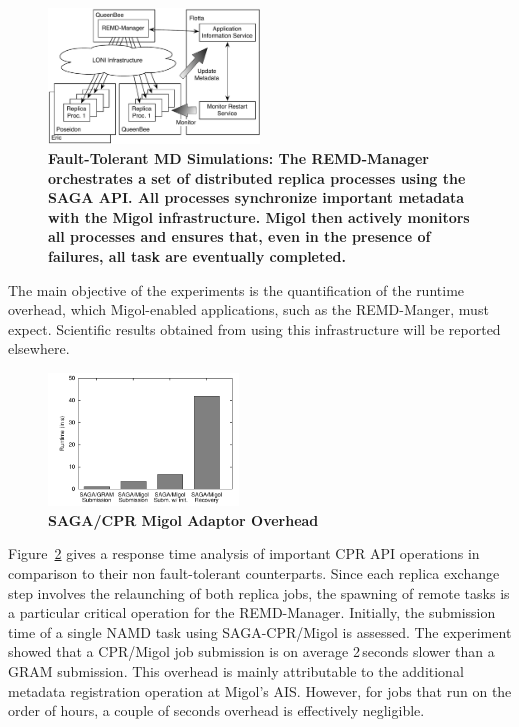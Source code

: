 \documentclass[conference,final]{IEEEtran}
\newcommand{\jhanote}[1]{ {\textcolor{red} { ***SJ: #1 }}}
\newcommand{\jhanote}[1]{}
\newcommand{\up}{\vspace*{-1em}}
\begin{document}
\begin{figure}[t]
    \centering
        \includegraphics[width=0.5\textwidth]{saga-taskfarming}
        \caption{\small \bf Fault-Tolerant MD Simulations: The
          REMD-Manager orchestrates a set of distributed replica
          processes using the SAGA API. All processes synchronize
          important metadata with the Migol infrastructure. Migol then
          actively monitors all processes and ensures that, even in
          the presence of failures, all task are eventually
          completed.\up\up}
    \label{fig:saga-taskfarming}
\end{figure} 
The main objective of the experiments is the quantification of the runtime overhead, 
which Migol-enabled applications, such as the REMD-Manger, must expect.
Scientific results obtained from using this infrastructure will be 
reported elsewhere.

\begin{figure}[ht]
    \centering
        \includegraphics[width=0.45\textwidth]{performance/perf_submission.pdf}
    \up
    \caption{\small \bf SAGA/CPR Migol Adaptor Overhead}
    
    \label{fig:performance_perf_submission}
\end{figure}           
Figure~\ref{fig:performance_perf_submission} gives a response time
analysis of important CPR API operations in comparison to their non
fault-tolerant counterparts. Since each replica exchange step involves
the relaunching of both replica jobs, the spawning of remote tasks is
a particular critical operation for the REMD-Manager.
Initially, the submission time of a single NAMD task
using SAGA-CPR/Migol is assessed. The experiment showed that a
CPR/Migol job submission is on average 2\,seconds slower than a 
GRAM submission. This overhead is mainly attributable to the
additional metadata registration operation at Migol's AIS. However,
for jobs that run on the order of hours, a couple of seconds overhead
is effectively negligible.
\end{document}
